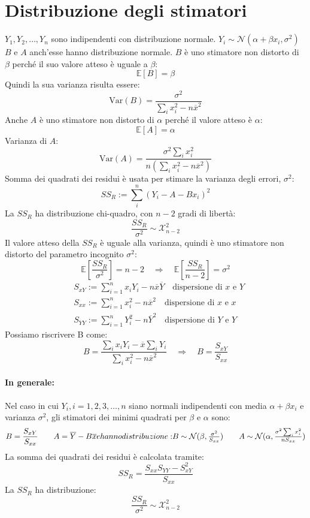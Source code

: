 \documentclass[]{article}
\newcommand{\ev}{\mathbb{E}[X]}
\renewcommand{\ev}[1]{\mathbb{E}\left[#1\right]}
\begin{document}
    \section{Distribuzione degli stimatori}
    $Y_1, Y_2, \ldots, Y_n$ sono indipendenti con distribuzione normale. $Y_i \sim \mathcal N(\alpha + \beta x_i, \sigma^2)$
    $B$ e $A$ anch'esse hanno distribuzione normale.
    $B$ è uno stimatore non distorto di $\beta$ perché il suo valore atteso è uguale a $\beta$:
    \[ \ev{B} = \beta \]
    Quindi la sua varianza risulta essere:
    \[\text{Var}(B) = \frac{\sigma^2}{\sum_i x^2_i -n\overline x^2}\]
    Anche $A$ è uno stimatore non distorto di $\alpha$ perché il valore atteso è $\alpha$:
    \[  \ev{A} = \alpha \]
    Varianza di $A$:
    \[ \text{Var}(A) = \frac{\sigma^2 \sum_i x_i^2}{n(\sum_i x_i^2 - n \overline x^2)} \]
    Somma dei quadrati dei residui è usata per stimare la varianza degli errori, $\sigma^2$:
    \[ SS_R := \sum_i^n(Y_i - A - Bx_i)^2 \]
    La $SS_R$ ha distribuzione chi-quadro, con $n-2$ gradi di libertà:
    \[ \frac{SS_R}{\sigma^2} \sim \mathcal{X}^2_{n-2} \]
    Il valore atteso della $SS_R$ è uguale alla varianza, quindi è uno stimatore non distorto del parametro incognito $\sigma^2$:
    \[ \ev{\frac{SS_R}{\sigma^2}} = n - 2 \quad \Rightarrow \quad \ev{\frac{SS_R}{n-2}} = \sigma^2\] 
    \begin{equation*}
        \begin{split}
            &S_{xY} := \sum_{i=1}^n x_i Y_i - n \overline x \overline Y \quad \text{dispersione di $x$ e $Y$}\\
            &S_{xx} := \sum_{i = 1}^{n} x^2_i - n \overline x^2 \quad \text{dispersione di $x$ e $x$}\\
            &S_{YY} := \sum_{i=1}^{n} Y_i^2 - n \overline Y^2 \quad \text{dispersione di $Y$ e $Y$}
        \end{split}
    \end{equation*}
    Possiamo riscrivere B come:
    \[ B = \frac{\sum_ix_iY_i - \overline{x}\sum_i Y_i }{\sum_i x_i^2 - n \overline x^2} \quad \Rightarrow \quad B=\frac{S_{xY}}{S_{xx}}\]
    \paragraph{In generale:}
    Nel caso in cui $Y_i, i = 1,2,3,\ldots,n$  siano normali indipendenti con media $\alpha + \beta x_i$ e varianza $\sigma^2$, gli stimatori dei minimi quadrati per $\beta$ e $\alpha$ sono:
    \[ B = \frac{S_{xY}}{S_{xx}} \quad \quad A = \overline Y - B \overline x $$ e hanno distribuzione: $$ B \sim \mathcal N(\beta,\frac{\sigma^2}{S_{xx}}) \quad \quad A \sim \mathcal N(\alpha,\frac{\sigma^2 \sum_ix_i^2}{nS_{xx}}) \]
    La somma dei quadrati dei residui è calcolata tramite:
    \[ SS_R = \frac{S_{xx}S_{YY}- S_{xY}^2}{S_{xx}} \]
    La $SS_R$ ha distribuzione:
    \[ \frac{SS_R}{\sigma^2} \sim \mathcal X^2_{n-2} \]
\end{document}
